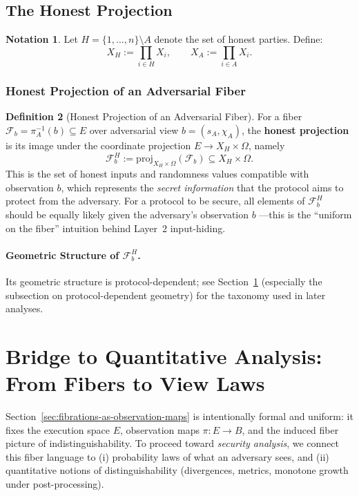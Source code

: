 \documentclass[11pt,a4paper]{article}
\theoremstyle{definition}
\newtheorem{definition}{Definition}[section]
\newtheorem{notation}[definition]{Notation}
\theoremstyle{plain}
\newcommand{\cF}{\mathcal{F}}
\begin{document}
\subsection{The Honest Projection}

\begin{notation}
Let $H = \{1, \ldots, n\} \setminus A$ denote the set of honest parties. Define:
\[
X_H := \prod_{i \in H} X_i, \qquad X_A := \prod_{i \in A} X_i.
\]
\end{notation}

\subsubsection{Honest Projection of an Adversarial Fiber}
\begin{definition}[Honest Projection of an Adversarial Fiber]
\label{def:honest-component}
For a fiber $\cF_b=\pi_A^{-1}(b)\subseteq E$ over adversarial view $b = (s_A, \chi_A)$, the \textbf{honest projection} is its image under the coordinate projection $E\to X_H\times\Omega$, namely
\[
\cF_b^H := \mathrm{proj}_{X_H \times \Omega}(\cF_b) \subseteq X_H \times \Omega.
\]
This is the set of honest inputs and randomness values compatible with observation $b$,
which represents the \emph{secret information} that the protocol
aims to protect from the adversary. For a protocol to be secure,
all elements of $\cF_b^H$ should be equally likely given the adversary's observation $b$
---this is the ``uniform on the fiber'' intuition behind Layer~2 input-hiding.
\end{definition}

\paragraph{Geometric Structure of $\cF_b^H$.}
Its geometric structure is protocol-dependent;
see Section~\ref{sec:bridge-to-analysis}
(especially the subsection on protocol-dependent geometry)
for the taxonomy used in later analyses.

\section{Bridge to Quantitative Analysis: From Fibers to View Laws}
\label{sec:bridge-to-analysis}

Section~\ref{sec:fibrations-as-observation-maps} is intentionally formal and uniform: it fixes the
execution space $E$, observation maps $\pi:E\to B$, and the induced fiber picture of
indistinguishability.
To proceed toward \emph{security analysis}, we connect this fiber language to
(i) probability laws of what an adversary sees, and (ii) quantitative notions of
distinguishability (divergences, metrics, monotone growth under post-processing).
\end{document}
